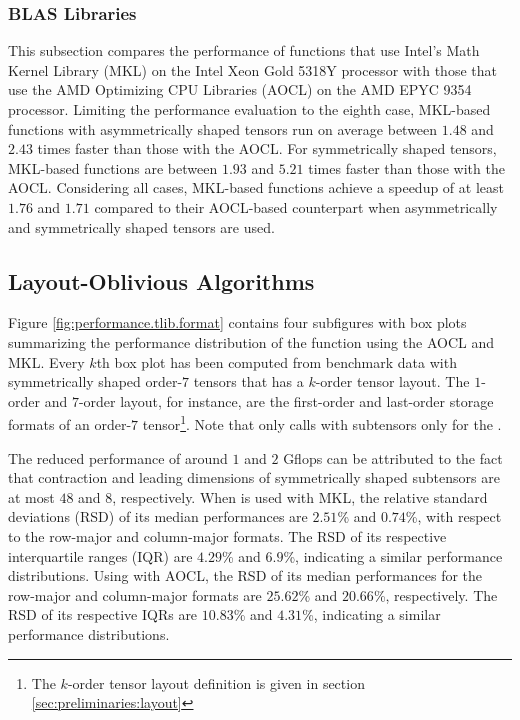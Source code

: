 \subsubsection{BLAS Libraries}
This subsection compares the performance of functions that use Intel's Math Kernel Library (MKL) on the Intel Xeon Gold 5318Y processor with those that use the AMD Optimizing CPU Libraries (AOCL) on the AMD EPYC 9354 processor. 
Limiting the performance evaluation to the eighth case, MKL-based functions with asymmetrically shaped tensors run on average between $1.48$ and $2.43$ times faster than those with the AOCL.
For symmetrically shaped tensors, MKL-based functions are between $1.93$ and $5.21$ times faster than those with the AOCL.
Considering all cases, MKL-based functions achieve a speedup of at least $1.76$ and $1.71$  compared to their AOCL-based counterpart when asymmetrically and symmetrically shaped tensors are used.


\subsection{Layout-Oblivious Algorithms}
Figure \ref{fig:performance.tlib.format} contains four subfigures with box plots summarizing the performance distribution of the  function using the AOCL and MKL.
Every $k$th box plot has been computed from benchmark data with symmetrically shaped order-$7$ tensors that has a $k$-order tensor layout.
The $1$-order and $7$-order layout, for instance, are the first-order and last-order storage formats of an order-$7$ tensor\footnote{The $k$-order tensor layout definition is given in section \ref{sec:preliminaries:layout}}.
Note that  only calls  with subtensors only for the .

The reduced performance of around $1$ and $2$ Gflops can be attributed to the fact that contraction and leading dimensions of symmetrically shaped subtensors are at most $48$ and $8$, respectively.
When  is used with MKL, the relative standard deviations (RSD) of its median performances are $2.51$\% and $0.74$\%, with respect to the row-major and column-major formats.
The RSD of its respective interquartile ranges (IQR) are $4.29$\% and $6.9$\%, indicating a similar performance distributions.
Using  with AOCL, the RSD of its median performances for the row-major and column-major formats are $25.62$\% and $20.66$\%, respectively.
The RSD of its respective IQRs are $10.83$\% and $4.31$\%, indicating a similar performance distributions.

